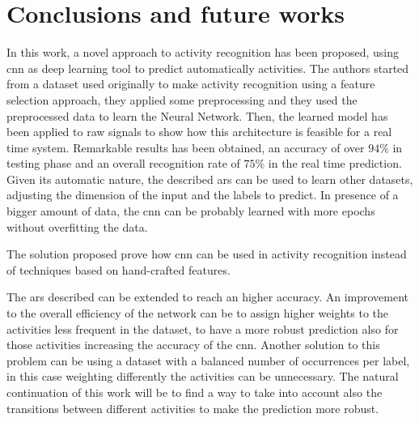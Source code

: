 \section{Conclusions and future works}
\label{sec:conclusions}

In this work, a novel approach to activity recognition has been proposed, using \gls{cnn} as deep learning tool to predict automatically activities.
The authors started from a dataset used originally to make activity recognition using a feature selection approach, they applied some preprocessing and they used the preprocessed data to learn the Neural Network.
Then, the learned model has been applied to raw signals to show how this architecture is feasible for a real time system.
Remarkable results has been obtained, an accuracy of over $94\%$ in testing phase and an overall recognition rate of $75\%$ in the real time prediction.
Given its automatic nature, the described \gls{ars} can be used to learn other datasets, adjusting the dimension of the input and the labels to predict. In presence of a bigger amount of data, the \gls{cnn} can be probably learned with more epochs without overfitting the data.

The solution proposed prove how \gls{cnn} can be used in activity recognition instead of techniques based on hand-crafted features.

The \gls{ars} described can be extended to reach an higher accuracy.
An improvement to the overall efficiency of the network can be to assign higher weights to the activities less frequent in the dataset, to have a more robust prediction also for those activities increasing the accuracy of the \gls{cnn}.
Another solution to this problem can be using a dataset with a balanced number of occurrences per label, in this case weighting differently the activities can be unnecessary.
The natural continuation of this work will be to find a way to take into account also the transitions between different activities to make the prediction more robust.

